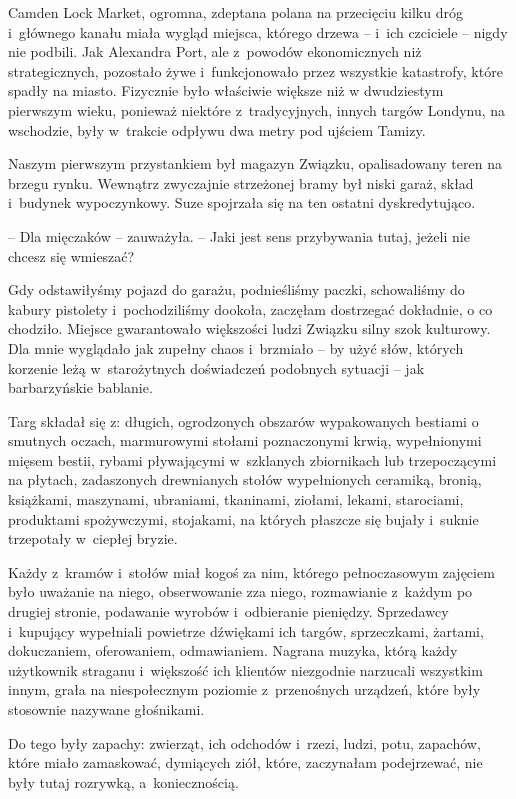 \documentclass[oneside,polish,11pt,sfheadings]{mwbk}
\begin{document}
Camden Lock Market, ogromna, zdeptana polana na przecięciu kilku dróg i~głównego kanału miała wygląd miejsca, którego drzewa -- i~ich czciciele -- nigdy nie podbili. Jak Alexandra Port, ale z~powodów ekonomicznych niż
strategicznych, pozostało żywe i~funkcjonowało przez wszystkie
katastrofy, które spadły na miasto. Fizycznie było właściwie większe niż
w dwudziestym pierwszym wieku, ponieważ niektóre z~tradycyjnych, innych
targów Londynu, na wschodzie, były w~trakcie odpływu dwa metry pod
ujściem Tamizy.

Naszym pierwszym przystankiem był magazyn Związku, opalisadowany teren
na brzegu rynku. Wewnątrz zwyczajnie strzeżonej bramy był niski garaż,
skład i~budynek wypoczynkowy. Suze spojrzała się na ten ostatni
dyskredytująco.

-- Dla mięczaków -- zauważyła. -- Jaki jest sens przybywania tutaj, jeżeli
nie chcesz się wmieszać?

Gdy odstawiłyśmy pojazd do garażu, podnieśliśmy paczki, schowaliśmy do
kabury pistolety i~pochodziliśmy dookoła, zaczęłam dostrzegać dokładnie,
o co chodziło. Miejsce gwarantowało większości ludzi Związku silny szok
kulturowy. Dla mnie wyglądało jak zupełny chaos i~brzmiało -- by użyć
słów, których korzenie leżą w~starożytnych doświadczeń podobnych
sytuacji -- jak barbarzyńskie bablanie.

Targ składał się z: długich, ogrodzonych obszarów wypakowanych bestiami
o smutnych oczach, marmurowymi stołami poznaczonymi krwią, wypełnionymi
mięsem bestii, rybami pływającymi w~szklanych zbiornikach lub
trzepoczącymi na płytach, zadaszonych drewnianych stołów wypełnionych
ceramiką, bronią, książkami, maszynami, ubraniami, tkaninami, ziołami,
lekami, starociami, produktami spożywczymi, stojakami, na których
płaszcze się bujały i~suknie trzepotały w~ciepłej bryzie.

Każdy z~kramów i~stołów miał kogoś za nim, którego pełnoczasowym
zajęciem było uważanie na niego, obserwowanie zza niego, rozmawianie z~każdym po drugiej stronie, podawanie wyrobów i~odbieranie pieniędzy.
Sprzedawcy i~kupujący wypełniali powietrze dźwiękami ich targów,
sprzeczkami, żartami, dokuczaniem, oferowaniem, odmawianiem. Nagrana
muzyka, którą każdy użytkownik straganu i~większość ich klientów
niezgodnie narzucali wszystkim innym, grała na niespołecznym poziomie z~przenośnych urządzeń, które były stosownie nazywane głośnikami.

Do tego były zapachy: zwierząt, ich odchodów i~rzezi, ludzi, potu,
zapachów, które miało zamaskować, dymiących ziół, które, zaczynałam
podejrzewać, nie były tutaj rozrywką, a~koniecznością.
\end{document}
